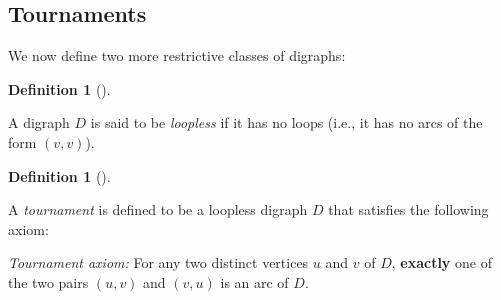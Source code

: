 \documentclass[numbers=enddot,12pt,final,onecolumn,notitlepage]{scrartcl}%
\numberwithin{exer}{subsection}
\theoremstyle{definition}
\newtheorem{defi}[theo]{Definition}
\newenvironment{definition}[1][]
{\begin{defi}[#1]\begin{leftbar}}
{\end{leftbar}\end{defi}}
\begin{document}
\subsection{Tournaments}

We now define two more restrictive classes of digraphs:

\begin{definition}
A digraph $D$ is said to be \emph{loopless} if it has no loops (i.e., it has
no arcs of the form $\left(  v,v\right)  $).
\end{definition}

\begin{definition}
\label{def.tourn.tourn}A \emph{tournament} is defined to be a loopless digraph
$D$ that satisfies the following axiom:

\emph{Tournament axiom:} For any two distinct vertices $u$ and $v$ of $D$,
\textbf{exactly} one of the two pairs $\left(  u,v\right)  $ and $\left(
v,u\right)  $ is an arc of $D$.
\end{definition}
\end{document}
